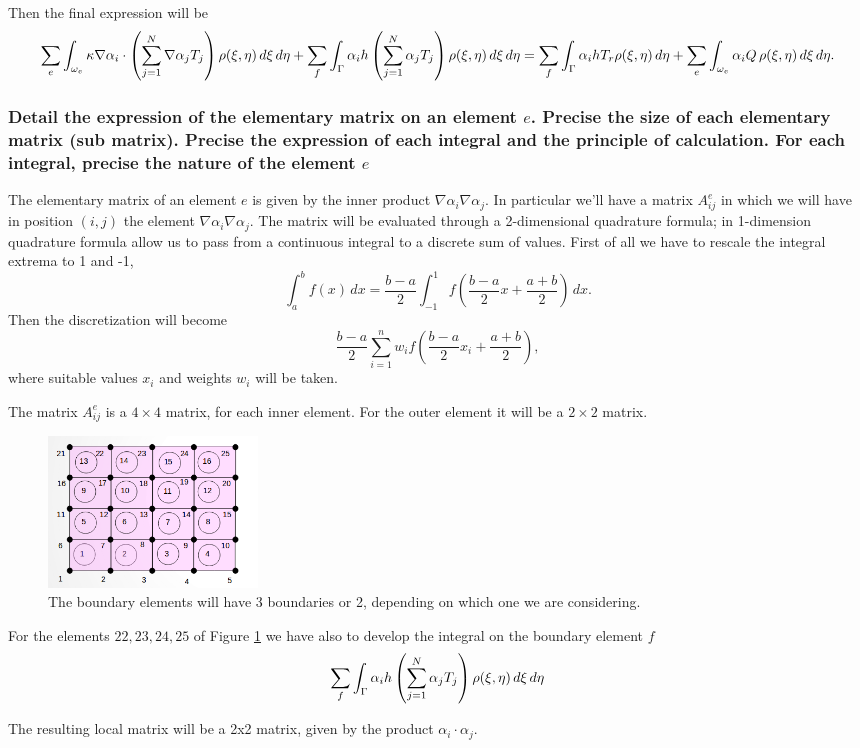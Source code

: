 Then the final expression will be
\begin{align*}
\sum_e\int_{\omega_e}\kappa\nabla\alpha_i\cdot\left(\sum_{j=1}^{N}\nabla\alpha_jT_j \right) \rho(\xi,\eta)\mathop{}\!d\xi\mathop{}\!d\eta +\sum_f\int_{\Gamma}\alpha_i h\left(\sum_{j=1}^{N}\alpha_jT_j\right)\rho(\xi,\eta)\mathop{}\!d\xi\mathop{}\!d \eta = \sum_f\int_{\Gamma}\alpha_i h T_r\rho(\xi,\eta)\mathop{}\!d \eta+\sum_e\int_{\omega_e}\alpha_iQ\,\rho(\xi,\eta)\mathop{}\!d\xi\mathop{}\!d\eta.
\end{align*}


\subsubsection{Detail the expression of the elementary matrix on an element $ e $. Precise the size of each elementary matrix (sub matrix). Precise the expression of each integral and the principle of calculation. For each integral, precise the nature of the element $ e $} 

The elementary matrix of an element $ e $ is given by the inner product $ \nabla\alpha_i\nabla\alpha_j $. In particular we'll have a matrix $ A_{ij}^e $ in which we will have in position $ (i,j) $ the element $ \nabla\alpha_i\nabla\alpha_j $. 
The matrix will be evaluated through a 2-dimensional quadrature formula; in 1-dimension quadrature formula allow us to pass from a continuous integral to a discrete sum of values. First of all we have to rescale the integral extrema to 1 and -1,
\[\int_{a}^{b}f(x)\,dx = \frac{b-a}{2}\int_{-1}^{1}f\left(\frac {b-a}{2}x+ \frac{a+b}{2}\right)\, dx. \]
Then the discretization will become
\[ \frac{b-a}{2} \sum_{i=1}^{n}w_{i}f\left(\frac {b-a}{2}x_{i}+ \frac{a+b}{2}\right),\]
where suitable values $ x_i $ and weights $ w_i $ will be taken.

The matrix $ A_{ij}^e $ is a $ 4\times4 $ matrix, for each inner element. For the outer element it will be a $ 2\times2 $ matrix. 
\begin{figure}
	\centering
	\includegraphics[height=4cm]{Images/mesh.png}
	\caption{The boundary elements will have 3 boundaries or 2, depending on which one we are considering.}
	\label{Img:sample_mesh}
\end{figure}

For the elements $ 22,23,24,25 $ of Figure \ref{Img:sample_mesh} we have also to develop the integral on the boundary element $ f $
\[\sum_f\int_{\Gamma}\alpha_i h\left(\sum_{j=1}^{N}\alpha_jT_j\right)\rho(\xi,\eta)\mathop{}\!d\xi\mathop{}\!d \eta \]

The resulting local matrix will be a 2x2 matrix, given by the product $ \alpha_i\cdot\alpha_j $.


